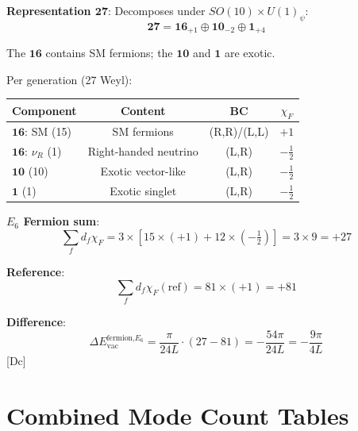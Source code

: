 \documentclass[11pt,a4paper]{article}
\newcommand{\tagDc}{\textcolor{blue!50!black}{[Dc]}}
\begin{document}
\begin{trackbox}
\textbf{Representation $\mathbf{27}$}: Decomposes under $SO(10) \times U(1)_\psi$:
\begin{equation}
\label{eq:27-decomp}
\mathbf{27} = \mathbf{16}_{+1} \oplus \mathbf{10}_{-2} \oplus \mathbf{1}_{+4}
\end{equation}

The $\mathbf{16}$ contains SM fermions; the $\mathbf{10}$ and $\mathbf{1}$ are exotic.

Per generation (27 Weyl):
\begin{center}
\begin{tabular}{lccc}
\toprule
Component & Content & BC & $\chi_F$ \\
\midrule
$\mathbf{16}$: SM (15) & SM fermions & (R,R)/(L,L) & $+1$ \\
$\mathbf{16}$: $\nu_R$ (1) & Right-handed neutrino & (L,R) & $-\frac{1}{2}$ \\
$\mathbf{10}$ (10) & Exotic vector-like & (L,R) & $-\frac{1}{2}$ \\
$\mathbf{1}$ (1) & Exotic singlet & (L,R) & $-\frac{1}{2}$ \\
\bottomrule
\end{tabular}
\end{center}

\textbf{$E_6$ Fermion sum}:
\begin{equation}
\label{eq:e6-ferm-sum}
\sum_f d_f \chi_F = 3 \times [15 \times (+1) + 12 \times (-\tfrac{1}{2})] = 3 \times 9 = +27
\end{equation}

\textbf{Reference}:
\begin{equation}
\label{eq:e6-ferm-ref}
\sum_f d_f \chi_F(\text{ref}) = 81 \times (+1) = +81
\end{equation}

\textbf{Difference}:
\begin{equation}
\label{eq:e6-ferm-diff}
\Delta E_{\text{vac}}^{\text{fermion,}E_6} = \frac{\pi}{24L} \cdot (27 - 81) = -\frac{54\pi}{24L} = -\frac{9\pi}{4L}
\end{equation}
\tagDc
\end{trackbox}

\section{Combined Mode Count Tables}
\end{document}
